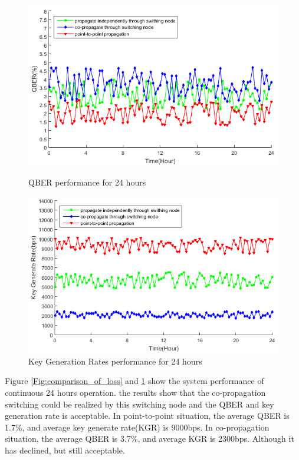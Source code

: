 \documentclass[letterpaper,10pt]{article}
\begin{document}
\begin{figure}[!htb]
   \begin{minipage}{0.48\textwidth}
     \centering
     \includegraphics[width=.9\linewidth]{qber_experiment}
     \caption{QBER performance for 24 hours} \label{Fig:comparison_of_loss}
   \end{minipage}\hfill
   \begin{minipage}{0.48\textwidth}
     \centering
     \includegraphics[width=.9\linewidth]{key_rate_experiment}
     \caption{Key Generation Rates performance for 24 hours} \label{Fig:comparison_of_rate}
   \end{minipage}
\end{figure}
Figure \ref{Fig:comparison_of_loss} and \ref{Fig:comparison_of_rate} show the system performance of continuous 24 hours operation. the results show that the co-propagation switching could be realized by this switching node and the QBER and key generation rate is acceptable. In point-to-point situation, the average QBER is 1.7\%, and average key generate rate(KGR) is 9000bps. In co-propagation situation, the average QBER is 3.7\%, and average KGR is 2300bps. Although it has declined, but still acceptable.
\end{document}
